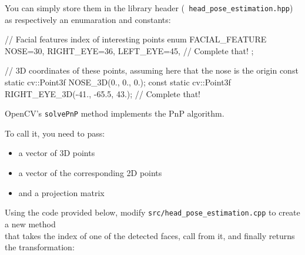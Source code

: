\documentclass{instructions}
\begin{document}

You can simply store them in the library header ({\tt
head\_pose\_estimation.hpp}) as respectively an enumaration and constants:

\begin{cppcode}
// Facial features index of interesting points
enum FACIAL_FEATURE {
    NOSE=30,
    RIGHT_EYE=36,
    LEFT_EYE=45,
    // Complete that!
};

// 3D coordinates of these points, assuming here that the nose is the origin
const static cv::Point3f NOSE_3D(0., 0., 0.);
const static cv::Point3f RIGHT_EYE_3D(-41., -65.5, 43.);
// Complete that!
\end{cppcode}




OpenCV's {\tt solvePnP} method implements the PnP algorithm.

To call it, you need to pass:
\begin{itemize}
    \item a vector of 3D points
    \item a vector of the corresponding 2D points
    \item and a projection matrix
\end{itemize}

Using the code provided below, modify {\tt src/head\_pose\_estimation.cpp} to
create a new method \\  that takes
the index of one of the detected faces, call  from it, and
finally returns the transformation:
\end{document}
